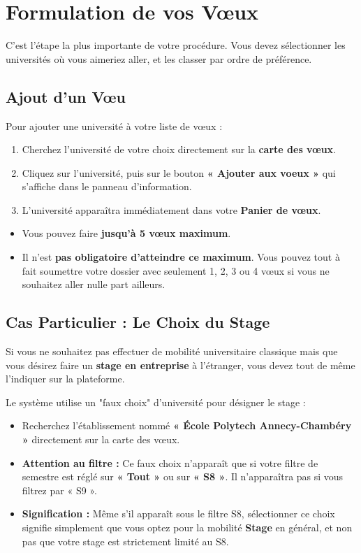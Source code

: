 \documentclass[12pt,a4paper]{article}
\begin{document}
\section{Formulation de vos Vœux}
C'est l'étape la plus importante de votre procédure. Vous devez sélectionner les universités où vous aimeriez aller, et les classer par ordre de préférence.

\subsection{Ajout d'un Vœu}
Pour ajouter une université à votre liste de vœux :
\begin{enumerate}
    \item Cherchez l'université de votre choix directement sur la \textbf{carte des vœux}.
    \item Cliquez sur l'université, puis sur le bouton \textbf{« Ajouter aux voeux »} qui s'affiche dans le panneau d'information.
    \item L'université apparaîtra immédiatement dans votre \textbf{Panier de vœux}.
\end{enumerate}

\begin{tcolorbox}[colback=yellow!10!white,colframe=orange!80!black,title=Règles sur la quantité de vœux]
\begin{itemize}
    \item Vous pouvez faire \textbf{jusqu'à 5 vœux maximum}.
    \item Il n'est \textbf{pas obligatoire d'atteindre ce maximum}. Vous pouvez tout à fait soumettre votre dossier avec seulement 1, 2, 3 ou 4 vœux si vous ne souhaitez aller nulle part ailleurs.
\end{itemize}
\end{tcolorbox}

\subsection{Cas Particulier : Le Choix du Stage}
Si vous ne souhaitez pas effectuer de mobilité universitaire classique mais que vous désirez faire un \textbf{stage en entreprise} à l'étranger, vous devez tout de même l'indiquer sur la plateforme.

Le système utilise un "faux choix" d'université pour désigner le stage :
\begin{itemize}
    \item Recherchez l'établissement nommé \textbf{« École Polytech Annecy-Chambéry »} directement sur la carte des vœux.
    \item \textbf{Attention au filtre :} Ce faux choix n'apparaît que si votre filtre de semestre est réglé sur \textbf{« Tout »} ou sur \textbf{« S8 »}. Il n'apparaîtra pas si vous filtrez par « S9 ».
    \item \textbf{Signification :} Même s'il apparaît sous le filtre S8, sélectionner ce choix signifie simplement que vous optez pour la mobilité \textbf{Stage} en général, et non pas que votre stage est strictement limité au S8.
\end{itemize}
\end{document}
